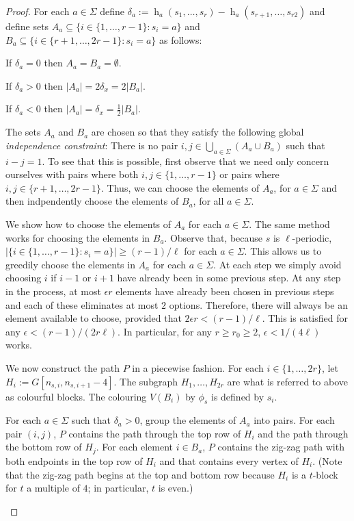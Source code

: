 \documentclass{patmorin}
\DeclareMathOperator{\hist}{h}
\begin{document}
\begin{proof}
    For each $a\in\Sigma$ define $\delta_a := \hist_a(s_1,\ldots,s_r)-\hist_a(s_{r+1},\ldots,s_{r2})$ and define sets $A_a\subseteq\{i\in \{1,\ldots,r-1\}: s_i=a\}$ and $B_a\subseteq\{i\in\{r+1,\ldots,2r-1\}:s_i=a\}$ as follows:
    \begin{compactenum}
        \item If $\delta_a=0$ then $A_a=B_a=\emptyset$.
        \item If $\delta_a>0$ then $|A_a|=2\delta_x=2|B_a|$.
        \item If $\delta_a<0$ then $|A_a|=\delta_x=\tfrac{1}{2}|B_a|$.
    \end{compactenum}
    The sets $A_a$ and $B_a$ are chosen so that they satisfy the following global \emph{independence constraint}:  There is no pair $i,j\in \bigcup_{a\in\Sigma}(A_a\cup B_a)$ such that $i-j=1$.  To see that this is possible, first observe that we need only concern ourselves with pairs where both $i,j\in\{1,\ldots,r-1\}$ or pairs where $i,j\in\{r+1,\ldots,2r-1\}$.  Thus, we can choose the elements of $A_a$, for $a\in\Sigma$ and then indpendently choose the elements of $B_a$, for all $a\in\Sigma$.

    We show how to choose the elements of $A_a$ for each $a\in\Sigma$.  The same method works for choosing the elements in $B_a$. Observe that, because $s$ is $\ell$-periodic, $|\{i\in \{1,\ldots,r-1\}:s_i=a\}|\ge (r-1)/\ell$ for each $a\in\Sigma$.  This allows us to greedily choose the elements in $A_a$ for each $a\in\Sigma$. At each step we simply avoid choosing $i$ if $i-1$ or $i+1$ have already been in some previous step.  At any step in the process, at most $\epsilon r$ elements have already been chosen in previous steps and each of these eliminates at most $2$ options.  Therefore, there will always be an element available to choose, provided that $2\epsilon r < (r-1)/\ell$.  This is satisfied for any $\epsilon < (r-1)/(2r\ell)$. In particular, for any $r\ge r_0\ge 2$, $\epsilon < 1/(4\ell)$ works.

    We now construct the path $P$ in a piecewise fashion.  For each $i\in\{1,\ldots,2r\}$, let $H_i:=G[n_{s,i},n_{s,i+1}-4]$. The subgraph $H_1,\ldots,H_{2r}$ are what is referred to above as colourful blocks.  The colouring $V(B_i)$ by $\phi_s$ is defined by $s_i$.
    \begin{compactenum}
        \item For each $a\in\Sigma$ such that $\delta_a>0$, group the elements of $A_a$ into pairs.  For each pair $(i,j)$, $P$ contains the path through the top row of $H_i$ and the path through the bottom row of $H_j$.  For each element $i\in B_a$, $P$ contains the zig-zag path with both endpoints in the top row of $H_i$ and that contains every vertex of $H_i$.  (Note that the zig-zag path begins at the top and bottom row because $H_i$ is a $t$-block for $t$ a multiple of $4$; in particular, $t$ is even.)


\end{compactenum}
\end{proof}
\end{document}
